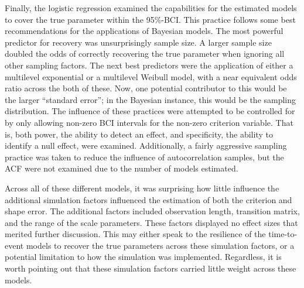 \documentclass[12pt]{./styles/outhesis}
\begin{document}
Finally, the logistic regression examined the capabilities for the
estimated models to cover the true parameter within the 95\%-BCI. This
practice follows some best recommendations for the applications of
Bayesian models. The most powerful predictor for recovery was
unsurprisingly sample size. A larger sample size doubled the odds of
correctly recovering the true parameter when ignoring all other sampling
factors. The next best predictors were the application of either a
multilevel exponential or a multilevel Weibull model, with a near
equivalent odds ratio across the both of these. Now, one potential
contributor to this would be the larger ``standard error''; in the
Bayesian instance, this would be the sampling distribution. The
influence of these practices were attempted to be controlled for by only
allowing non-zero BCI intervals for the non-zero criterion variable. That is, both power, the ability to detect an effect, and specificity, the ability to identify a null effect, were examined. 
Additionally, a fairly aggressive sampling practice was taken to reduce
the influence of autocorrelation samples, but the ACF were not examined
due to the number of models estimated.

Across all of these different models, it was surprising how little
influence the additional simulation factors influenced the estimation of
both the criterion and shape error. The additional factors included
observation length, transition matrix, and the range of the scale
parameters. These factors displayed no effect sizes that merited
further discussion. This may either speak to the resilience of the
time-to-event models to recover the true parameters across these
simulation factors, or a potential limitation to how the simulation was
implemented. Regardless, it is worth pointing out that these simulation
factors carried little weight across these models.
\end{document}
